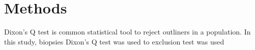 \chapter{Methods}

Dixon's Q test is common statistical tool to reject outliners in a population. In this study, biopsies  Dixon's Q test was used to   exclusion test was used 